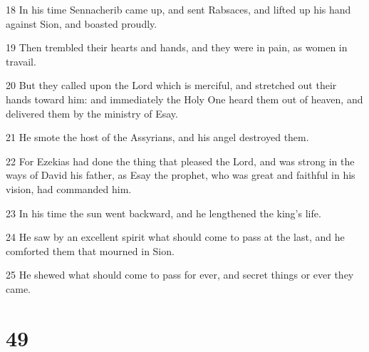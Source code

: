 \par 18 In his time Sennacherib came up, and sent Rabsaces, and lifted up his hand against Sion, and boasted proudly.
\par 19 Then trembled their hearts and hands, and they were in pain, as women in travail.
\par 20 But they called upon the Lord which is merciful, and stretched out their hands toward him: and immediately the Holy One heard them out of heaven, and delivered them by the ministry of Esay.
\par 21 He smote the host of the Assyrians, and his angel destroyed them.
\par 22 For Ezekias had done the thing that pleased the Lord, and was strong in the ways of David his father, as Esay the prophet, who was great and faithful in his vision, had commanded him.
\par 23 In his time the sun went backward, and he lengthened the king's life.
\par 24 He saw by an excellent spirit what should come to pass at the last, and he comforted them that mourned in Sion.
\par 25 He shewed what should come to pass for ever, and secret things or ever they came.

\chapter{49}

